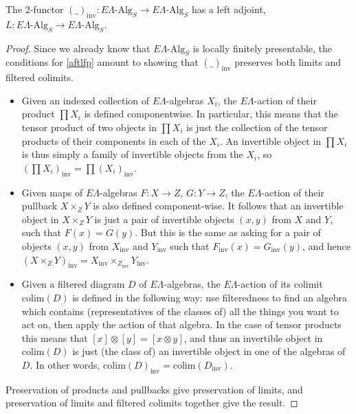 \documentclass{amsbook} %
\numberwithin{section}{chapter}
\begin{document}
\begin{prop} \label{invadj} The 2-functor $(\_)_{\mathrm{inv}}: E\Lambda\mbox{-}\mathrm{Alg}_S \to E\Lambda\mbox{-}\mathrm{Alg}_S$ has a left adjoint, $L: E\Lambda\mbox{-}\mathrm{Alg}_S \to E\Lambda\mbox{-}\mathrm{Alg}_S$.
\end{prop}
\begin{proof} Since we already know that $E\Lambda\mbox{-}\mathrm{Alg}_S$ is locally finitely presentable, the conditions for \cref{aftlfp} amount to showing that $(\_)_{\mathrm{inv}}$ preserves both limits and filtered colimits.
\begin{itemize}
\item Given an indexed collection of $E\Lambda$-algebras $X_i$, the $E\Lambda$-action of their product $\prod X_i$ is defined componentwise. In particular, this means that the tensor product of two objects in $\prod X_i$ is just the collection of the tensor products of their components in each of the $X_i$. An invertible object in $\prod X_i$ is thus simply a family of invertible objects from the $X_i$, so $(\prod X_i)_{\mathrm{inv}} = \prod (X_i)_{\mathrm{inv}}$.
\item Given maps of $E\Lambda$-algebras $F: X \to Z$, $G : Y \to Z$, the $E\Lambda$-action of their pullback $X \times_Z Y$ is also defined component-wise. It follows that an invertible object in $X \times_Z Y$ is just a pair of invertible objects $(x, y)$ from $X$ and $Y$, such that $F(x) = G(y)$. But this is the same as asking for a pair of objects $(x, y)$ from $X_{\mathrm{inv}}$ and $Y_{\mathrm{inv}}$ such that $F_{\mathrm{inv}}(x) = G_{\mathrm{inv}}(y)$, and hence $(X \times_Z Y)_{\mathrm{inv}} = X_{\mathrm{inv}} \times_{Z_{\mathrm{inv}}} Y_{\mathrm{inv}}$.
\item Given a filtered diagram $D$ of $E\Lambda$-algebras, the $E\Lambda$-action of its colimit $\mathrm{colim}(D)$ is defined in the following way: use filteredness to find an algebra which contains (representatives of the classes of) all the things you want to act on, then apply the action of that algebra. In the case of tensor products this means that $[x]\otimes[y] = [x \otimes y]$, and thus an invertible object in $\mathrm{colim}(D)$ is just (the class of) an invertible object in one of the algebras of $D$. In other words, $\mathrm{colim}(D)_{\mathrm{inv}} = \mathrm{colim}(D_{\mathrm{inv}})$.
\end{itemize}
Preservation of products and pullbacks give preservation of limits, and preservation of limits and filtered colimits together give the result.
\end{proof}
\end{document}

